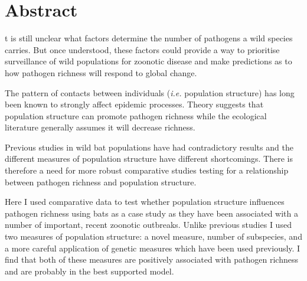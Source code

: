 





\section{Abstract}


t is still unclear what factors determine the number of pathogens a wild species carries.
But once understood, these factors could provide a way to prioritise surveillance of wild populations for zoonotic disease and make predictions as to how pathogen richness will respond to global change.




The pattern of contacts between individuals (\emph{i.e.} population structure) has long been known to strongly affect epidemic processes.
Theory suggests that population structure can promote pathogen richness while the ecological literature generally assumes it will decrease richness.



Previous studies in wild bat populations have had contradictory results and the different measures of population structure have different shortcomings.
There is therefore a need for more robust comparative studies testing for a relationship between pathogen richness and population structure.


Here I used comparative data to test whether population structure influences pathogen richness using bats as a case study as they have been associated with a number of important, recent zoonotic outbreaks.
Unlike previous studies I used two measures of population structure: a novel measure, number of subspecies, and a more careful application of genetic measures which have been used previously.
I find that both of these measures are positively associated with pathogen richness and are probably in the best supported model.



